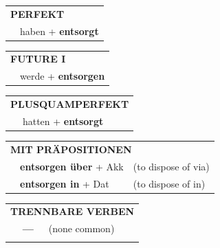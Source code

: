 \documentclass[10pt,a4paper]{revtex4-2}
\begin{document}
\begin{verbbox}
 \begin{tabular}{rl}
     \multicolumn{2}{l}{\textbf{PERFEKT}}\\
   & haben + \textbf{entsorgt}\\
  \end{tabular}
\hfill
   \begin{tabular}{rl}
    \multicolumn{2}{l}{\textbf{FUTURE I} }\\
   & werde + \textbf{entsorgen}\\
  \end{tabular}
\hfill
   \begin{tabular}{rl}
      \multicolumn{2}{l}{\textbf{PLUSQUAMPERFEKT}}\\
   & hatten + \textbf{entsorgt}\\
  \end{tabular}

   \vspace{10pt}

   \begin{tabular}{lll}
      \multicolumn{3}{l}{\textbf{MIT PRÄPOSITIONEN}}\\
& \textbf{entsorgen über} + Akk & (to dispose of via)\\
& \textbf{entsorgen in} + Dat & (to dispose of in)\\
\end{tabular}
  \hfill
   \begin{tabular}{lll}
      \multicolumn{3}{l}{\textbf{TRENNBARE VERBEN}}\\
 & \textbf{---} & (none common)\\
\vspace{10pt}
  \end{tabular}

  \vspace{-5pt}

\end{verbbox}
\end{document}
